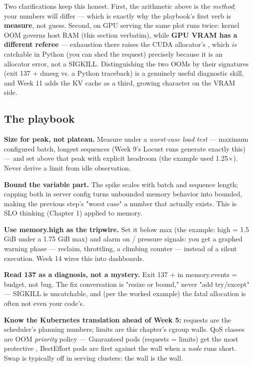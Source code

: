 \vspace{3.0pt}

Two clarifications keep this honest. First, the arithmetic above is the \textit{method}; your numbers will differ — which is exactly why the playbook's first verb is \textbf{measure}, not guess. Second, on GPU serving the same plot runs twice: kernel OOM governs host RAM (this section verbatim), while \textbf{GPU VRAM has a different referee} — exhaustion there raises the CUDA allocator's , which \textit{is} catchable in Python (you can shed the request) precisely because it is an allocator error, not a SIGKILL. Distinguishing the two OOMs by their signatures (exit 137 + dmesg vs. a Python traceback) is a genuinely useful diagnostic skill, and Week 11 adds the KV cache as a third, growing character on the VRAM side.

\subsection*{The playbook}

\begin{tbbitemize}
  \item \textbf{Size for peak, not plateau.} Measure  under a \textit{worst-case load test} — maximum configured batch, longest sequences (Week 9's Locust runs generate exactly this) — and set  above that peak with explicit headroom (the example used 1.25×). Never derive a limit from idle observation.
  \item \textbf{Bound the variable part.} The spike scales with batch and sequence length; capping both in server config turns unbounded memory behavior into bounded, making the previous step's "worst case" a number that actually exists. This is SLO thinking (Chapter 1) applied to memory.
  \item \textbf{Use memory.high as the tripwire.} Set it below max (the example: high = 1.5 GiB under a 1.75 GiB max) and alarm on  / pressure signals: you get a graphed warning phase — reclaim, throttling, a climbing counter — instead of a silent execution. Week 14 wires this into dashboards.
  \item \textbf{Read 137 as a diagnosis, not a mystery.} Exit 137 +  in memory.events = budget, not bug. The fix conversation is "resize or bound," never "add try/except" — SIGKILL is uncatchable, and (per the worked example) the fatal allocation is often not even your code's.
  \item \textbf{Know the Kubernetes translation ahead of Week 5:} requests are the scheduler's planning numbers; limits are this chapter's cgroup walls. QoS classes are OOM \textit{priority} policy — Guaranteed pods (requests = limits) get the most protective , BestEffort pods are first against the wall when a \textit{node} runs short. Swap is typically off in serving clusters: the wall is the wall.
\end{tbbitemize}

